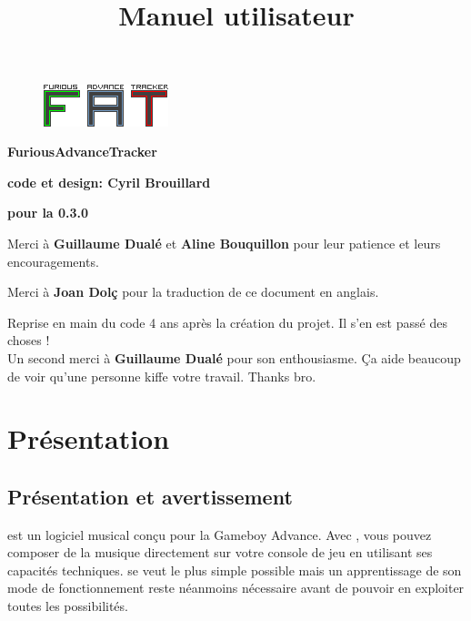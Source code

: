 \documentclass[12pt,a4paper]{article}
\title{\bf \SimpleImage{images/furicat_color}{0.3} \\ Manuel utilisateur}
\author{\fatversion}
\begin{document}
  \begin{figure}
    \begin{center}
    \includegraphics[scale=2]{images/logo}
    \end{center}
  \end{figure}
  \maketitle{}
  \thispagestyle{empty}
  \setcounter{page}{0}
  \ClearShipoutPicture

  \newpage

  \begin{center}
  
  {\bf \FAT FuriousAdvanceTracker} \medskip
  
  {\bf code et design: Cyril Brouillard} \medskip

  {\bf pour la 0.3.0} \medskip
  
  Merci à {\bf \textcolor{vert}{Guillaume Dualé}} et {\bf \textcolor{vert}{Aline Bouquillon}} pour leur patience et leurs encouragements.\medskip
  
  Merci à {\bf \textcolor{vert}{Joan Dolç}} pour la traduction de ce document en anglais. \medskip

  {\bf \fatversion} \medskip

  Reprise en main du code 4 ans après la création du projet. Il s'en est passé des choses ! \\
  Un second merci à {\bf \textcolor{vert}{Guillaume Dualé}} pour son enthousiasme. Ça aide beaucoup de voir qu'une personne kiffe votre travail. Thanks bro.

  \end{center}
  
  \thispagestyle{empty}
  \setcounter{page}{0}
  \ClearShipoutPicture
  \newpage
  
  \tableofcontents{}
  \newpage
  
  \section{Présentation}
    \subsection{Présentation et avertissement}
    \FAT est un logiciel musical conçu pour la Gameboy Advance. Avec \FAT, vous pouvez composer de la musique directement sur votre console de jeu en utilisant ses capacités techniques. \FAT se veut le plus simple possible mais un apprentissage de son mode de fonctionnement reste néanmoins nécessaire avant de pouvoir en exploiter toutes les possibilités.\medskip
    
\end{document}
